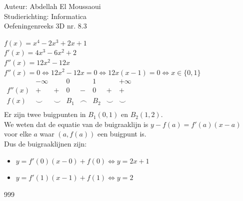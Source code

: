 \documentclass[a4paper]{article}
\begin{document}
  
\noindent \large Auteur: Abdellah El Moussaoui \\
\noindent \large Studierichting: Informatica\\
\noindent \large Oefeningenreeks 3D nr. 8.3\\

\medskip

\normalsize

$f(x)=x^4-2x^3+2x+1$\\

$f'(x)=4x^3-6x^2+2$\\

$f''(x)=12x^2-12x$\\

$f''(x)=0 \Leftrightarrow 12x^2-12x = 0 \Leftrightarrow 12x\left(x-1\right)=0 \Leftrightarrow x \in \{0,1\}$\\

$\begin{array}{r|ccccccc}
           & -\infty &        & 0   &        & 1   &        & +\infty \\
    \hline  
    f''(x) &    +    & +      & 0   & -      & 0   & +      &   +      \\
    f(x)   &     \smile    & \smile & B_1 & \frown & B_2 & \smile &    \smile     \\
\end{array}$ \\

Er zijn twee buigpunten in $B_1(0,1)$ en $B_2(1,2)$.\\

We weten dat de equatie van de buigraaklijn is $y-f(a)=f'(a)(x-a)$ voor elke $a$ waar $\left(a,f(a)\right)$ een buigpunt is.\\

Dus de buigraaklijnen zijn:\\
\begin{itemize}
    \item $y=f'(0)(x-0)+f(0) \Leftrightarrow \boxed{y=2x+1}$\\
    \item $y=f'(1)(x-1)+f(1) \Leftrightarrow \boxed{y=2}$\\
\end{itemize}

\begin{thebibliography}{999}
\end{thebibliography}
\end{document}
